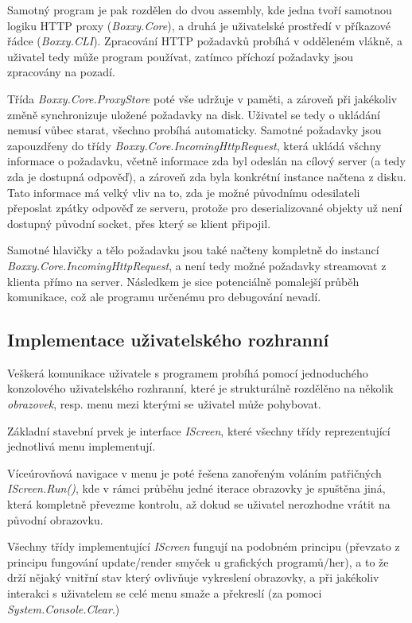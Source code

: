 \documentclass{article}
\begin{document}
Samotný program je pak rozdělen do dvou assembly, kde jedna tvoří samotnou logiku HTTP proxy (\emph{Boxxy.Core}), a druhá je uživatelské prostředí v příkazové řádce (\emph{Boxxy.CLI}). Zpracování HTTP požadavků probíhá v odděleném vlákně, a uživatel tedy může program používat, zatímco příchozí požadavky jsou zpracovány na pozadí.

Třída \emph{Boxxy.Core.ProxyStore} poté vše udržuje v paměti, a zároveň při jakékoliv změně synchronizuje uložené požadavky na disk. Uživatel se tedy o ukládání nemusí vůbec starat, všechno probíhá automaticky. Samotné požadavky jsou zapouzdřeny do třídy \emph{Boxxy.Core.IncomingHttpRequest}, která ukládá všchny informace o požadavku, včetně informace zda byl odeslán na cílový server (a tedy zda je dostupná odpověď), a zároveň zda byla konkrétní instance načtena z disku. Tato informace má velký vliv na to, zda je možné původnímu odesilateli přeposlat zpátky odpověď ze serveru, protože pro deserializované objekty už není dostupný původní socket, přes který se klient připojil.

Samotné hlavičky a tělo požadavku jsou také načteny kompletně do instancí \emph{Boxxy.Core.IncomingHttpRequest}, a není tedy možné požadavky streamovat z klienta přímo na server. Následkem je sice potenciálně pomalejší průběh komunikace, což ale programu určenému pro debugování nevadí.

\subsection{Implementace uživatelského rozhranní}

Veškerá komunikace uživatele s programem probíhá pomocí jednoduchého konzolového uživatelského rozhranní, které je strukturálně rozdělěno na několik \emph{obrazovek}, resp. menu mezi kterými se uživatel může pohybovat.

Základní stavební prvek je interface \emph{IScreen}, které všechny třídy reprezentující jednotlivá menu implementují.

Víceúrovňová navigace v menu je poté řešena zanořeným voláním patřičných \emph{IScreen.Run()}, kde v rámci průběhu jedné iterace obrazovky je spuštěna jiná, která kompletně převezme kontrolu, až dokud se uživatel nerozhodne vrátit na původní obrazovku.

Všechny třídy implementující \emph{IScreen} fungují na podobném principu (převzato z principu fungování update/render smyček u grafických programů/her), a to že drží nějaký vnitřní stav který ovlivňuje vykreslení obrazovky, a při jakékoliv interakci s uživatelem se celé menu smaže a překreslí (za pomoci \emph{System.Console.Clear}.)
\end{document}
